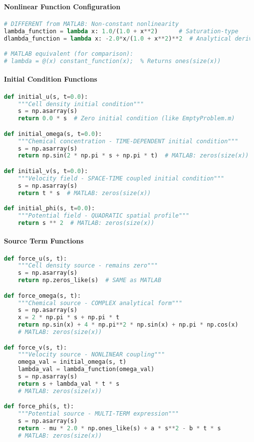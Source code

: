 \paragraph{Nonlinear Function Configuration}
\begin{lstlisting}[language=Python, caption=Python Nonlinear Function Setup]
# DIFFERENT from MATLAB: Non-constant nonlinearity
lambda_function = lambda x: 1.0/(1.0 + x**2)      # Saturation-type
dlambda_function = lambda x: -2.0*x/(1.0 + x**2)**2  # Analytical derivative

# MATLAB equivalent (for comparison):
# lambda = @(x) constant_function(x);  % Returns ones(size(x))
\end{lstlisting}

\paragraph{Initial Condition Functions}
\begin{lstlisting}[language=Python, caption=Python Initial Conditions - Complex]
def initial_u(s, t=0.0):
    """Cell density initial condition"""
    s = np.asarray(s)
    return 0.0 * s  # Zero initial condition (like EmptyProblem.m)

def initial_omega(s, t=0.0):
    """Chemical concentration - TIME-DEPENDENT initial condition"""
    s = np.asarray(s)
    return np.sin(2 * np.pi * s + np.pi * t)  # MATLAB: zeros(size(x))

def initial_v(s, t=0.0):
    """Velocity field - SPACE-TIME coupled initial condition"""
    s = np.asarray(s)
    return t * s  # MATLAB: zeros(size(x))

def initial_phi(s, t=0.0):
    """Potential field - QUADRATIC spatial profile"""
    return s ** 2  # MATLAB: zeros(size(x))
\end{lstlisting}

\paragraph{Source Term Functions}
\begin{lstlisting}[language=Python, caption=Python Source Terms - Non-Zero]
def force_u(s, t):
    """Cell density source - remains zero"""
    s = np.asarray(s)
    return np.zeros_like(s)  # SAME as MATLAB

def force_omega(s, t):
    """Chemical source - COMPLEX analytical form"""
    s = np.asarray(s)
    x = 2 * np.pi * s + np.pi * t
    return np.sin(x) + 4 * np.pi**2 * np.sin(x) + np.pi * np.cos(x)
    # MATLAB: zeros(size(x))

def force_v(s, t):
    """Velocity source - NONLINEAR coupling"""
    omega_val = initial_omega(s, t)
    lambda_val = lambda_function(omega_val)
    s = np.asarray(s)
    return s + lambda_val * t * s
    # MATLAB: zeros(size(x))

def force_phi(s, t):
    """Potential source - MULTI-TERM expression"""
    s = np.asarray(s)
    return - mu * 2.0 * np.ones_like(s) + a * s**2 - b * t * s
    # MATLAB: zeros(size(x))
\end{lstlisting}

